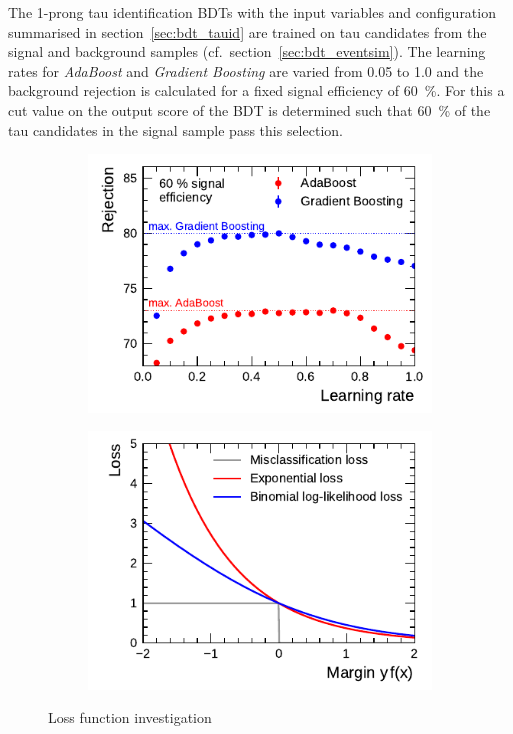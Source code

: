 The 1-prong tau identification BDTs with the input variables and configuration
summarised in section~\ref{sec:bdt_tauid} are trained on tau candidates from the
signal and background samples (cf.\ section~\ref{sec:bdt_eventsim}). The
learning rates for \emph{AdaBoost} and \emph{Gradient Boosting} are varied from
0.05 to 1.0 and the background rejection is calculated for a fixed signal
efficiency of \SI{60}{\percent}. For this a cut value on the output score of the
BDT is determined such that \SI{60}{\percent} of the tau candidates in the
signal sample pass this selection.

\begin{figure}[htb]
  \begin{subfigure}[t]{0.48\textwidth}
    \centering
    \includegraphics{./figures/bdt_perf/boosting.pdf}
    \label{fig:bdt_boosting_alg}
  \end{subfigure}\hfill
  \begin{subfigure}[t]{0.48\textwidth}
    \centering \includegraphics{./figures/theory/boosting_loss.pdf}
    \label{fig:boosting_loss}
  \end{subfigure}
  \caption{Loss function investigation}
\end{figure}

